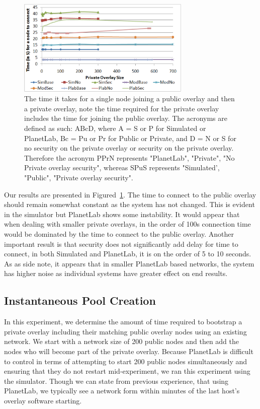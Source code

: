 \documentclass[conference]{IEEEtran}
\begin{document}
\begin{figure}[h]
\centering
\includegraphics[width=3.25in]{single_join.eps}
\caption{The time it takes for a single node joining a public overlay and then
a private overlay, note the time required for the private overlay includes the
time for joining the public overlay.  The acronyms are defined as such:  ABcD,
where A = S or P for Simulated or PlanetLab, Bc = Pu or Pr for Public or Private,
and D = N or S for no security on the private overlay or security on the private
overlay.  Therefore the acronym PPrN represents "PlanetLab", "Private", "No
Private overlay security", whereas SPuS represents "Simulated', "Public",
"Private overlay security".}
\label{fig:single_join}
\end{figure}

Our results are presented in Figured~\ref{fig:single_join}.  The time to
connect to the public overlay should remain somewhat constant as the system
has not changed.  This is evident in the simulator but PlanetLab shows
some instability.  It would appear that when dealing with smaller private
overlays, in the order of 100s connection time would be dominated by the
time to connect to the public overlay.  Another important result is that
security does not significantly add delay for time to connect, in both
Simulated and PlanetLab, it is on the order of 5 to 10 seconds.  As as side
note, it appears that in smaller PlanetLab based networks, the system has
higher noise as individual systems have greater effect on end results.

\subsection{Instantaneous Pool Creation}
In this experiment, we determine the amount of time required to bootstrap a
private overlay including their matching public overlay nodes using an existing
network.  We start with a network size of 200 public nodes and then add the
nodes who will become part of the private overlay.  Because PlanetLab is
difficult to control in terms of attempting to start 200 public nodes
simultaneously and ensuring that they do not restart mid-experiment, we ran
this experiment using the simulator.  Though we can state from previous
experience, that using PlanetLab, we typically see a network form within
minutes of the last host's overlay software starting.
\end{document}
